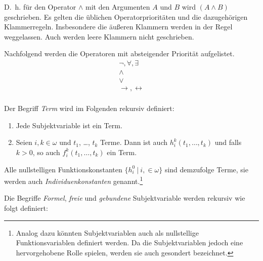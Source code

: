 \documentclass[a4paper,german,10pt,twoside]{book}
\theoremstyle{definition}
\theoremstyle{remark}
\begin{document}
D.~h. f{\"u}r den Operator $\land$ mit den Argumenten $A$ und $B$ wird $(A \land B)$ geschrieben. 
Es gelten die {\"u}blichen Operatorpriorit{\"a}ten und die dazugeh{\"o}rigen Klammerregeln. Insbesondere die {\"a}u{\ss}eren Klammern werden in der Regel weggelassen. Auch werden leere Klammern nicht geschrieben.

\par
Nachfolgend werden die Operatoren mit absteigender Priorit{\"a}t aufgelistet.
$$
\begin{array}{c}
  \neg, \forall, \exists  \\
  \land \\
  \lor \\
  \rightarrow, \leftrightarrow \\
\end{array}
$$

\par
Der Begriff \emph{Term} wird im Folgenden rekursiv definiert:

\begin{enumerate}
\item Jede Subjektvariable ist ein Term. \item Seien $i, k \in \omega$ und $t_1$, \ldots, $t_k$ Terme. Dann ist auch $h^k_i(t_1, \ldots, t_k)$ und falls $k > 0$, so auch $f^k_i(t_1, \ldots, t_k)$ ein Term.
\end{enumerate}

Alle nullstelligen Funktionskonstanten $\{h^0_i~|~i, \in \omega\}$ sind demzufolge Terme, sie werden auch 
\emph{Individuenkonstanten} genannt.\footnote{Analog dazu k{\"o}nnten Subjektvariablen auch als nullstellige Funktionsvariablen definiert werden. Da die Subjektvariablen jedoch eine hervorgehobene Rolle spielen, werden sie auch gesondert bezeichnet.}

\par
Die Begriffe \emph{Formel}, \emph{freie} und 
\emph{gebundene} Subjektvariable werden rekursiv wie folgt definiert:
\end{document}

